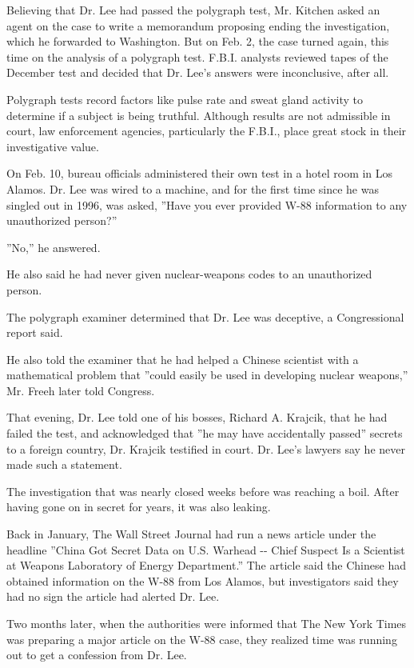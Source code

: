 Believing that Dr. Lee had passed the polygraph test, Mr. Kitchen asked
an agent on the case to write a memorandum proposing ending the
investigation, which he forwarded to Washington. But on Feb. 2, the case
turned again, this time on the analysis of a polygraph test. F.B.I.
analysts reviewed tapes of the December test and decided that Dr. Lee's
answers were inconclusive, after all.

Polygraph tests record factors like pulse rate and sweat gland activity
to determine if a subject is being truthful. Although results are not
admissible in court, law enforcement agencies, particularly the F.B.I.,
place great stock in their investigative value.

On Feb. 10, bureau officials administered their own test in a hotel room
in Los Alamos. Dr. Lee was wired to a machine, and for the first time
since he was singled out in 1996, was asked, ''Have you ever provided
W-88 information to any unauthorized person?''

''No,'' he answered.

He also said he had never given nuclear-weapons codes to an unauthorized
person.

The polygraph examiner determined that Dr. Lee was deceptive, a
Congressional report said.

He also told the examiner that he had helped a Chinese scientist with a
mathematical problem that ''could easily be used in developing nuclear
weapons,'' Mr. Freeh later told Congress.

That evening, Dr. Lee told one of his bosses, Richard A. Krajcik, that
he had failed the test, and acknowledged that ''he may have accidentally
passed'' secrets to a foreign country, Dr. Krajcik testified in court.
Dr. Lee's lawyers say he never made such a statement.

The investigation that was nearly closed weeks before was reaching a
boil. After having gone on in secret for years, it was also leaking.

Back in January, The Wall Street Journal had run a news article under
the headline ''China Got Secret Data on U.S. Warhead -\/- Chief Suspect
Is a Scientist at Weapons Laboratory of Energy Department.'' The article
said the Chinese had obtained information on the W-88 from Los Alamos,
but investigators said they had no sign the article had alerted Dr. Lee.

Two months later, when the authorities were informed that The New York
Times was preparing a major article on the W-88 case, they realized time
was running out to get a confession from Dr. Lee.

